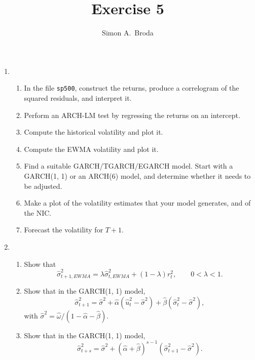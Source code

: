 \documentclass[11pt, a4paper]{article}
\begin{document}
\title{Exercise 5}
\author{Simon A.\ Broda}
\date{}
\maketitle

\begin{enumerate}

\item
\begin{enumerate}
\item In the file \texttt{sp500}, construct the returns, produce a correlogram of the squared residuals, and interpret it.
\item Perform an ARCH-LM test by regressing the returns on an intercept.
\item Compute the historical volatility and plot it.
\item Compute the EWMA volatility and plot it.
\item Find a suitable GARCH/TGARCH/EGARCH model. Start with a GARCH(1, 1) or an ARCH(6) model, and determine whether it needs to be adjusted.
\item Make a plot of the volatility estimates that your model generates, and of the NIC.
\item Forecast the volatility for $T+1$.
\end{enumerate}
\item
\begin{enumerate}
\item Show that
\[
\widehat{\sigma}_{t+1,EWMA}^{2} =\lambda\widehat{\sigma}_{t,EWMA}^{2}+(1-\lambda )r_{t}^{2},\qquad 0<\lambda <1.
\]
\item Show that in the GARCH(1, 1) model,
\[
\widehat{\sigma} _{t+1}^{2}=\widehat{\sigma}^2+\hat{\alpha}(\hat{u}_{t}^{2}-\widehat{\sigma}^2)+\hat{\beta} (\widehat{\sigma} _{t}^{2}-\widehat{\sigma}^2),
\]
with $\widehat{\sigma}^2=\hat{\omega} /(1-\hat\alpha -\hat\beta )$.
\item Show that in the GARCH(1, 1) model,
\[
\widehat{\sigma} _{t+s}^{2}=\widehat{\sigma} ^{2}+(\hat\alpha+\hat\beta)^{s-1} (\widehat{\sigma}_{t+1}^{2}-\widehat{\sigma} ^{2}).
\]
\end{enumerate}
\end{enumerate}
\end{document}
